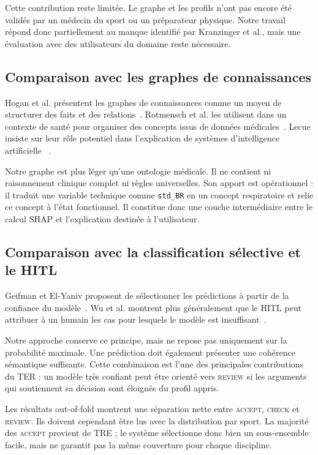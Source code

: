 \documentclass[12pt,a4paper]{article}
\begin{document}
Cette contribution reste limitée. Le graphe et les profils n'ont pas encore
été validés par un médecin du sport ou un préparateur physique. Notre travail
répond donc partiellement au manque identifié par Kranzinger et al., mais une
évaluation avec des utilisateurs du domaine reste nécessaire.

\subsection{Comparaison avec les graphes de connaissances}

Hogan et al. présentent les graphes de connaissances comme un moyen de
structurer des faits et des relations~\cite{hogan2020}. Rotmensch et al. les
utilisent dans un contexte de santé pour organiser des concepts issus de
données médicales~\cite{rotmensch2017}. Lecue insiste sur leur rôle potentiel
dans l'explication de systèmes d'intelligence artificielle
~\cite{lecue2020}.

Notre graphe est plus léger qu'une ontologie médicale. Il ne contient ni
raisonnement clinique complet ni règles universelles. Son apport est
opérationnel : il traduit une variable technique comme \texttt{std\_BR} en un
concept respiratoire et relie ce concept à l'état fonctionnel. Il constitue
donc une couche intermédiaire entre le calcul SHAP et l'explication destinée à
l'utilisateur.

\subsection{Comparaison avec la classification sélective et le HITL}

Geifman et El-Yaniv proposent de sélectionner les prédictions à partir de la
confiance du modèle~\cite{geifman2017}. Wu et al. montrent plus généralement
que le HITL peut attribuer à un humain les cas pour lesquels le modèle est
insuffisant~\cite{wu2021}.

Notre approche conserve ce principe, mais ne repose pas uniquement sur la
probabilité maximale. Une prédiction doit également présenter une cohérence
sémantique suffisante. Cette combinaison est l'une des principales
contributions du TER : un modèle très confiant peut être orienté vers
\textsc{review} si les arguments qui soutiennent sa décision sont éloignés du
profil appris.

Les résultats out-of-fold montrent une séparation nette entre
\textsc{accept}, \textsc{check} et \textsc{review}. Ils doivent cependant être
lus avec la distribution par sport. La majorité des \textsc{accept} provient
de TRE ; le système sélectionne donc bien un sous-ensemble facile, mais ne
garantit pas la même couverture pour chaque discipline.
\end{document}
